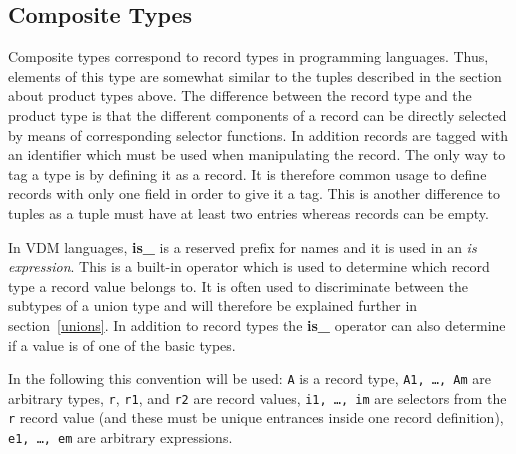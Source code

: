 \documentclass{overturerepchap}
\newcommand{\keyw}[1]{{\bf\ttfamily #1}}
\begin{document}
\subsection{Composite Types}\label{records}

Composite types correspond to record types in programming languages.
Thus, elements of this type are somewhat similar to the tuples
described in the section about product types above. The difference
between the record type and the product type is that the different
components of a record can be directly selected by means of
corresponding selector functions. In addition records are tagged with
an identifier which must be used when manipulating the record. The
only way to tag a type is by defining it as a record. It is therefore
common usage to define records with only one field in order to give it
a tag. This is another difference to tuples as a tuple must have at
least two entries whereas records can be empty.

In VDM languages, \keyw{is\_} is a reserved prefix for names
and it is used in an {\it is expression}. This is a built-in operator
which is used to determine which record type a record value belongs to.
It is often used to discriminate between the subtypes of a union type
and will therefore be explained further in section~\ref{unions}. In
addition to record types the \keyw{is\_} operator can also determine if
a value is of one of the basic types.

In the following this convention will be used: {\tt A} is a record
type, {\tt A1, \ldots, Am} are arbitrary types, {\tt r}, {\tt r1}, and
{\tt r2} are record values, {\tt i1, \ldots, im} are selectors from
the {\tt r} record value (and these must be unique entrances inside one record definition), {\tt e1, \ldots, em} are arbitrary
expressions.
\end{document}
